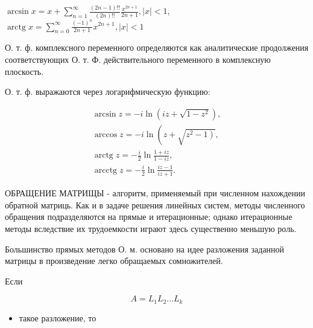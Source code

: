 \documentclass[10pt]{article}
\begin{document}
$\arcsin x=x+\sum_{n=1}^{\infty} \frac{(2 n-1) ! !}{(2 n) ! !} \frac{x^{2 n+1}}{2 n+1},|x|<1$, $\operatorname{arctg} x=\sum_{n=0}^{\infty} \frac{(-1)^{n}}{2 n+1} x^{2 n+1},|x|<1$



О. т. ф. комплексного переменного определяются как аналитические продолжения соответствующих О. т. Ф. действительного переменного в комплексную плоскость.



О. т. ф. выражаются через логарифмическую функцию:



\[

\begin{gathered}

\arcsin z=-i \ln \left(i z+\sqrt{1-z^{2}}\right), \\

\arccos z=-i \ln \left(z+\sqrt{\left.z^{2}-1\right)},\right. \\

\operatorname{arctg} z=-\frac{i}{2} \ln \frac{1+i z}{1-i z}, \\

\operatorname{arcctg} z=-\frac{i}{2} \ln \frac{i z-1}{i z+1} .

\end{gathered}

\]



ОБРАЩЕНИЕ МАТРИЩЫ - алгоритм, применяемый при численном нахождении обратной матриць. Как и в задаче решения линейных систем, методы численного обращения подразделяются на прямые и итерационные; однако итерационные методы вследствие их трудоемкости играют здесь существенно меньшую роль.



Большинство прямых методов О. м. основано на идее разложения заданной матрицы в произведение легко обращаемых сомножителей.



Если



\[

A=L_{1} L_{2} \ldots L_{k}

\]



\begin{itemize}

  \item такое разложение, то

\end{itemize}
\end{document}
